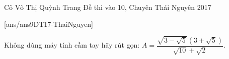 \begin{name}
{Cô Võ Thị Quỳnh Trang}
{Đề thi vào 10, Chuyên Thái Nguyên 2017}
\end{name}
\setcounter{ex}{0}
[ans/ans9DT17-ThaiNguyen]
\begin{ex}%
    Không dùng máy tính cầm tay hãy rút gọn: $A=\dfrac{\sqrt{3-\sqrt{5}} \left( 3+\sqrt{5}\right) }{\sqrt{10}+\sqrt{2}}.$
\end{ex}


